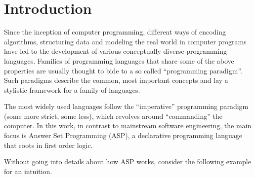 \documentclass{vutinfth} %
\begin{document}

\tableofcontents %

\mainmatter

\chapter{Introduction}
\label{chap:intro}

Since the inception of computer programming, different ways of encoding algorithms, structuring data and modeling the real world in computer programs have led to the development of various conceptually diverse programming languages. Families of programming languages that share some of the above properties are usually thought to bide to a so called \enquote{programming paradigm}.
Such paradigms describe the common, most important concepts and lay a stylistic framework for a family of languages.

The most widely used languages follow the \enquote{imperative} programming paradigm (some more strict, some less), which revolves around \enquote{commanding} the computer. In this work, in contrast to mainstream software engineering, the main focus is Answer Set Programming (ASP), a declarative programming language that roots in first order logic.

Without going into details about how ASP works, consider the following example for an intuition.
\end{document}
